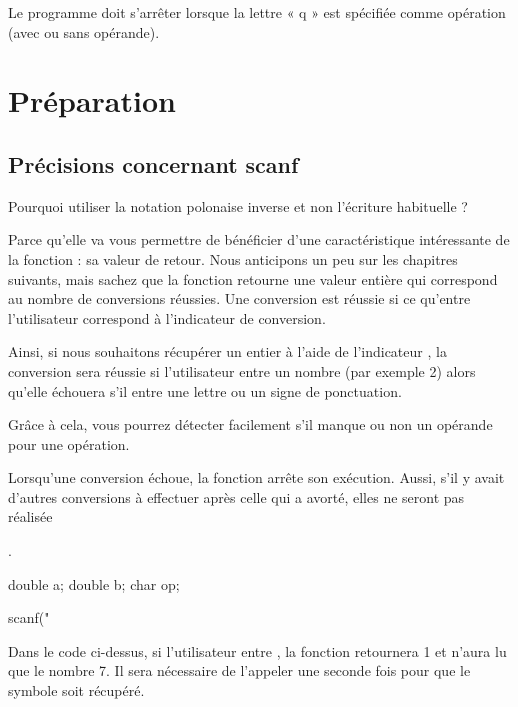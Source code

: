 Le programme doit s'arrêter lorsque la lettre « q » est spécifiée comme
opération (avec ou sans opérande).

\section{Préparation}
\label{preparation}

\subsection{Précisions concernant scanf}
\label{precisions-concernant-scanf}

\begin{questionbox}
Pourquoi utiliser la notation polonaise
inverse et non l'écriture habituelle ?
\end{questionbox}

Parce qu'elle va vous permettre de bénéficier d'une caractéristique
intéressante de la fonction  : sa valeur de retour. Nous
anticipons un peu sur les chapitres suivants, mais sachez que la
fonction  retourne une valeur entière qui correspond au
nombre de conversions réussies. Une conversion est réussie si ce
qu'entre l'utilisateur correspond à l'indicateur de conversion.

Ainsi, si nous souhaitons récupérer un entier à l'aide de l'indicateur
, la conversion sera réussie si l'utilisateur entre un nombre
(par exemple 2) alors qu'elle échouera s'il entre une lettre ou un signe
de ponctuation.

Grâce à cela, vous pourrez détecter facilement s'il manque ou non un
opérande pour une opération.

\begin{attentionbox}
  Lorsqu'une conversion échoue, la
fonction  arrête son exécution. Aussi, s'il y avait
d'autres conversions à effectuer après celle qui a avorté, elles ne
seront pas réalisée
\end{attentionbox}
.

\begin{C}
double a;
double b;
char op;

scanf("%
\end{C}

Dans le code ci-dessus, si l'utilisateur entre , la
fonction  retournera 1 et n'aura lu que le nombre 7. Il
sera nécessaire de l'appeler une seconde fois pour que le symbole
\mybox{*} soit récupéré.

